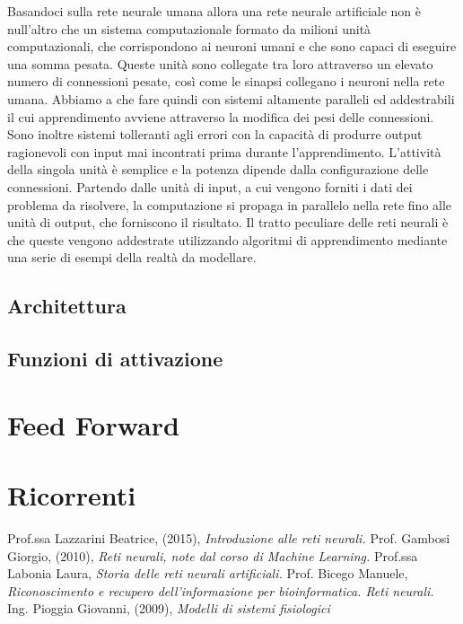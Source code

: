 \documentclass[12pt,a4paper,oneside]{book}
\begin{document}
		Basandoci sulla rete neurale umana allora una rete neurale artificiale non è null'altro che un sistema computazionale formato da milioni unità computazionali, che corrispondono ai neuroni umani e che sono capaci di eseguire una somma pesata. Queste unità sono collegate tra loro attraverso un elevato numero di connessioni pesate, così come le sinapsi collegano i neuroni nella rete umana. Abbiamo a che fare quindi con sistemi altamente paralleli ed addestrabili il cui apprendimento avviene attraverso la modifica dei pesi delle connessioni. Sono inoltre sistemi tolleranti agli errori con la capacità di produrre output ragionevoli con input mai incontrati prima durante l'apprendimento. L'attività della singola unità è semplice e la potenza dipende dalla configurazione delle connessioni.
		Partendo dalle unità di input, a cui vengono forniti i dati dei problema da risolvere, la computazione si propaga in parallelo nella rete fino alle unità di output, che forniscono il risultato.
		Il tratto peculiare delle reti neurali è che queste vengono addestrate utilizzando algoritmi di apprendimento mediante una serie di esempi della realtà da modellare.
		
		 
		\section{Architettura}
		\section{Funzioni di attivazione}
	
	\chapter{Feed Forward}
	\chapter{Ricorrenti}

\clearpage 
\begin{thebibliography}{9} 
	 Prof.ssa Lazzarini Beatrice, (2015), \emph{Introduzione alle reti neurali.}
	 Prof. Gambosi Giorgio, (2010), \emph{Reti neurali, note dal corso di Machine Learning.}
	 Prof.ssa Labonia Laura, \emph{Storia delle reti neurali artificiali.}
	 Prof. Bicego Manuele, \emph{Riconoscimento e recupero dell’informazione per bioinformatica. Reti neurali.}
	 Ing. Pioggia Giovanni, (2009), \emph{Modelli di sistemi fisiologici}
 \end{thebibliography}
	
\end{document}
